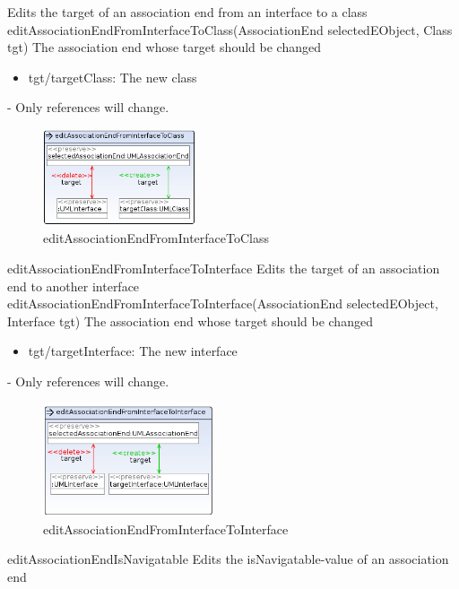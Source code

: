 {Edits the target of an association end from an interface to a class}
{editAssociationEndFromInterfaceToClass(AssociationEnd selectedEObject,
Class tgt)}
{The association end whose target should be changed}
{
\begin{itemize}
 \item tgt/targetClass: The new class
\end{itemize}
}
{-}
{Only references will change.}
\begin{figure}[H]
  \centering
  \includegraphics[width=0.4\textwidth]{pics/editAssociationEndFromInterfaceToClass.png}
  \caption{editAssociationEndFromInterfaceToClass}
  \label{editAssociationEndFromInterfaceToClass}
\end{figure}
\op
{editAssociationEndFromInterfaceToInterface}
{Edits the target of an association end to another interface}
{editAssociationEndFromInterfaceToInterface(AssociationEnd selectedEObject,
Interface tgt)}
{The association end whose target should be changed}
{
\begin{itemize}
 \item tgt/targetInterface: The new interface
\end{itemize}
}
{-}
{Only references will change.}
\begin{figure}[H]
  \centering
  \includegraphics[width=0.45\textwidth]{pics/editAssociationEndFromInterfaceToInterface.png}
  \caption{editAssociationEndFromInterfaceToInterface}
  \label{editAssociationEndFromInterfaceToInterface}
\end{figure}
\op
{editAssociationEndIsNavigatable}
{Edits the isNavigatable-value of an association end}
